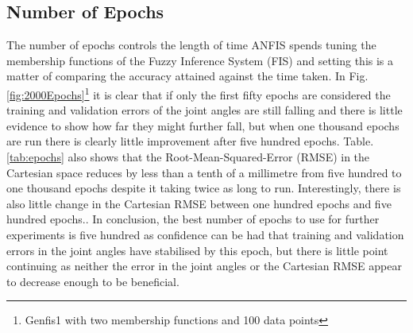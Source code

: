 \documentclass[11.5pt, twoside, a4paper]{article}
\begin{document}
\begin{table}
\caption{Results from changing range of $\theta_3$. \label{tab:range}}
\end{table}


\subsection{Number of Epochs}
The number of epochs controls the length of time ANFIS spends tuning the membership functions of the Fuzzy Inference System (FIS) and setting this is a matter of comparing the accuracy attained against the time taken. In Fig.\ref{fig:2000Epochs}\footnote{Genfis1 with two membership functions and 100 data points} it is clear that if only the first fifty epochs are considered the training and validation errors of the joint angles are still falling and there is little evidence to show how far they might further fall, but when one thousand epochs are run there is clearly little improvement after five hundred epochs. Table.\ref{tab:epochs} also shows that the Root-Mean-Squared-Error (RMSE) in the Cartesian space reduces by less than a tenth of a millimetre from five hundred to one thousand epochs despite it taking twice as long to run. Interestingly, there is also little change in the Cartesian RMSE between one hundred epochs and five hundred epochs.. In conclusion, the best number of epochs to use for further experiments is five hundred as confidence can be had that training and validation errors in the joint angles have stabilised by this epoch, but there is little point continuing as neither the error in the joint angles or the Cartesian RMSE appear to decrease enough to be beneficial.
\end{document}
